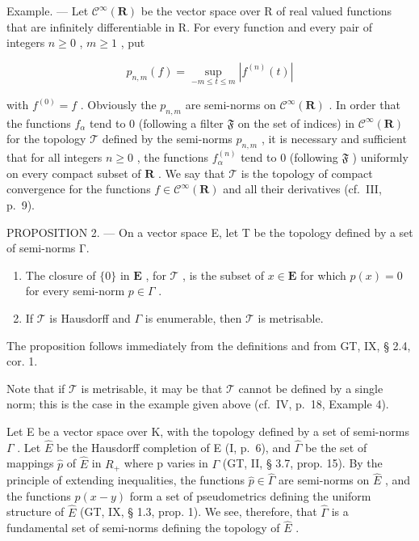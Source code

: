 Example. --- Let \(\mathcal{C}^{\infty}(\mathbf{R})\) be the vector space over R of real valued functions that are infinitely differentiable in R. For every function and every pair of integers \(n \geqslant 0\) , \(m \geqslant 1\) , put

\[
p _ {n, m} (f) = \sup _ {- m \leqslant t \leqslant m} | f ^ {(n)} (t) |\tag{2}
\]

with \(f^{(0)} = f\) . Obviously the \(p_{n,m}\) are semi-norms on \(\mathcal{C}^{\infty}(\mathbf{R})\) . In order that the functions \(f_{\alpha}\) tend to 0 (following a filter \(\mathfrak{F}\) on the set of indices) in \(\mathcal{C}^{\infty}(\mathbf{R})\) for the topology \(\mathcal{T}\) defined by the semi-norms \(p_{n,m}\) , it is necessary and sufficient that for all integers \(n \geqslant 0\) , the functions \(f_{\alpha}^{(n)}\) tend to 0 (following \(\mathfrak{F}\) ) uniformly on every compact subset of \(\mathbf{R}\) . We say that \(\mathcal{T}\) is the topology of compact convergence for the functions \(f \in \mathcal{C}^{\infty}(\mathbf{R})\) and all their derivatives (cf.~III, p.~9).

PROPOSITION 2. --- On a vector space E, let T be the topology defined by a set of semi-norms Γ.

\begin{enumerate}
\def\labelenumi{(\roman{enumi})}
\item
  The closure of \(\{0\}\) in \(\mathbf{E}\) , for \(\mathcal{T}\) , is the subset of \(x \in \mathbf{E}\) for which \(p(x) = 0\) for every semi-norm \(p \in \Gamma\) .
\item
  If \(\mathcal{T}\) is Hausdorff and \(\Gamma\) is enumerable, then \(\mathcal{T}\) is metrisable.
\end{enumerate}

The proposition follows immediately from the definitions and from GT, IX, § 2.4, cor. 1.

Note that if \(\mathcal{T}\) is metrisable, it may be that \(\mathcal{T}\) cannot be defined by a single norm; this is the case in the example given above (cf.~IV, p.~18, Example 4).

Let E be a vector space over K, with the topology defined by a set of semi-norms \(\Gamma\) . Let \(\hat{E}\) be the Hausdorff completion of E (I, p.~6), and \(\hat{\Gamma}\) be the set of mappings \(\hat{p}\) of \(\hat{E}\) in \(R_{+}\) where p varies in \(\Gamma\) (GT, II, § 3.7, prop. 15). By the principle of extending inequalities, the functions \(\hat{p} \in \hat{\Gamma}\) are semi-norms on \(\hat{E}\) , and the functions \(\hat{p}(x - y)\) form a set of pseudometrics defining the uniform structure of \(\hat{E}\) (GT, IX, § 1.3, prop. 1). We see, therefore, that \(\hat{\Gamma}\) is a fundamental set of semi-norms defining the topology of \(\hat{E}\) .


